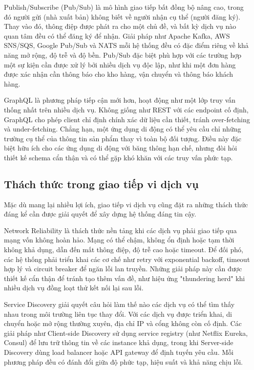 Publish/Subscribe (Pub/Sub) là mô hình giao tiếp bất đồng bộ nâng cao, trong đó người gửi (nhà xuất bản) không biết về người nhận cụ thể (người đăng ký). Thay vào đó, thông điệp được phát ra cho một chủ đề, và bất kỳ dịch vụ nào quan tâm đều có thể đăng ký để nhận. Giải pháp như Apache Kafka, AWS SNS/SQS, Google Pub/Sub và NATS mỗi hệ thống đều có đặc điểm riêng về khả năng mở rộng, độ trễ và độ bền. Pub/Sub đặc biệt phù hợp với các trường hợp một sự kiện cần được xử lý bởi nhiều dịch vụ độc lập, như khi một đơn hàng được xác nhận cần thông báo cho kho hàng, vận chuyển và thông báo khách hàng.

GraphQL là phương pháp tiếp cận mới hơn, hoạt động như một lớp truy vấn thống nhất trên nhiều dịch vụ. Không giống như REST với các endpoint cố định, GraphQL cho phép client chỉ định chính xác dữ liệu cần thiết, tránh over-fetching và under-fetching. Chẳng hạn, một ứng dụng di động có thể yêu cầu chỉ những trường cụ thể của thông tin sản phẩm thay vì toàn bộ đối tượng. Điều này đặc biệt hữu ích cho các ứng dụng di động với băng thông hạn chế, nhưng đòi hỏi thiết kế schema cẩn thận và có thể gặp khó khăn với các truy vấn phức tạp.

\subsection{Thách thức trong giao tiếp vi dịch vụ}
Mặc dù mang lại nhiều lợi ích, giao tiếp vi dịch vụ cũng đặt ra những thách thức đáng kể cần được giải quyết để xây dựng hệ thống đáng tin cậy.

Network Reliability là thách thức nền tảng khi các dịch vụ phải giao tiếp qua mạng vốn không hoàn hảo. Mạng có thể chậm, không ổn định hoặc tạm thời không khả dụng, dẫn đến mất thông điệp, độ trễ cao hoặc timeout. Để đối phó, các hệ thống phải triển khai các cơ chế như retry với exponential backoff, timeout hợp lý và circuit breaker để ngăn lỗi lan truyền. Những giải pháp này cần được thiết kế cẩn thận để tránh tạo thêm vấn đề, như hiệu ứng "thundering herd" khi nhiều dịch vụ đồng loạt thử kết nối lại sau lỗi.

Service Discovery giải quyết câu hỏi làm thế nào các dịch vụ có thể tìm thấy nhau trong môi trường liên tục thay đổi. Với các dịch vụ được triển khai, di chuyển hoặc mở rộng thường xuyên, địa chỉ IP và cổng không còn cố định. Các giải pháp như Client-side Discovery sử dụng service registry (như Netflix Eureka, Consul) để lưu trữ thông tin về các instance khả dụng, trong khi Server-side Discovery dùng load balancer hoặc API gateway để định tuyến yêu cầu. Mỗi phương pháp đều có đánh đổi giữa độ phức tạp, hiệu suất và khả năng chịu lỗi.

